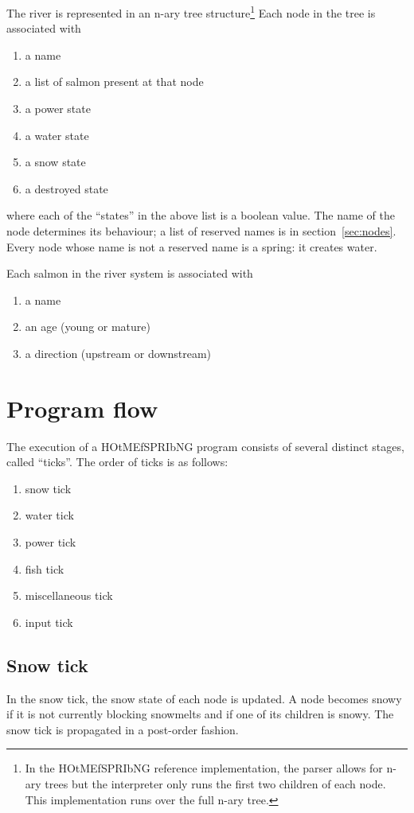 \documentclass[10pt]{article}
\begin{document}
The river is represented in an n-ary tree structure\footnote{In the HOtMEfSPRIbNG reference implementation, the parser
allows for n-ary trees but the interpreter only runs the first two children of each node. This implementation runs over
the full n-ary tree.} Each node in the tree is associated with
\begin{enumerate}
\item a name
\item a list of salmon present at that node
\item a power state
\item a water state
\item a snow state
\item a destroyed state
\end{enumerate}
where each of the ``states'' in the above list is a boolean value. The name of the node determines its behaviour; a list
of reserved names is in section~\ref{sec:nodes}. Every node whose name is not a reserved name is a spring: it creates water.

Each salmon in the river system is associated with
\begin{enumerate}
\item a name
\item an age (young or mature)
\item a direction (upstream or downstream)
\end{enumerate}

\section{Program flow}

The execution of a HOtMEfSPRIbNG program consists of several distinct stages, called ``ticks''. The order of ticks is as
follows:
\begin{enumerate}
\item snow tick
\item water tick
\item power tick
\item fish tick
\item miscellaneous tick
\item input tick
\end{enumerate}

\subsection{Snow tick}

In the snow tick, the snow state of each node is updated. A node becomes snowy if it is not currently blocking snowmelts
and if one of its children is snowy. The snow tick is propagated in a post-order fashion.
\end{document}

